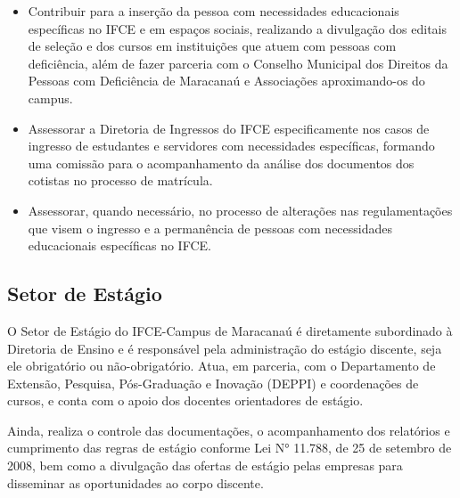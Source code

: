 \begin{itemize}
	\item Contribuir para a inserção da pessoa com necessidades educacionais específicas no IFCE e em espaços sociais, realizando a divulgação dos editais de seleção e dos cursos em instituições que atuem com pessoas com deficiência, além de fazer parceria com o Conselho Municipal dos Direitos da Pessoas com Deficiência de Maracanaú e Associações aproximando-os do campus.
	\item Assessorar a Diretoria de Ingressos do IFCE especificamente nos casos de ingresso de estudantes e servidores com necessidades específicas, formando uma comissão para o acompanhamento da análise dos documentos dos cotistas no processo de matrícula.
	\item Assessorar, quando necessário, no processo de alterações nas regulamentações que visem o ingresso e a permanência de pessoas com necessidades educacionais específicas no IFCE.
\end{itemize}

\subsection{Setor de Estágio} 


O Setor de Estágio do IFCE-Campus de Maracanaú é diretamente subordinado à Diretoria de Ensino e é responsável pela administração do estágio discente, seja ele obrigatório ou não-obrigatório. Atua, em parceria, com o Departamento de Extensão, Pesquisa, Pós-Graduação e Inovação (DEPPI) e coordenações de cursos, e conta com o apoio dos docentes orientadores de estágio.

Ainda, realiza o controle das documentações, o acompanhamento dos relatórios e cumprimento das regras de estágio conforme Lei N° 11.788, de 25 de setembro de 2008, bem como a divulgação das ofertas de estágio pelas empresas para disseminar as oportunidades ao corpo discente.

